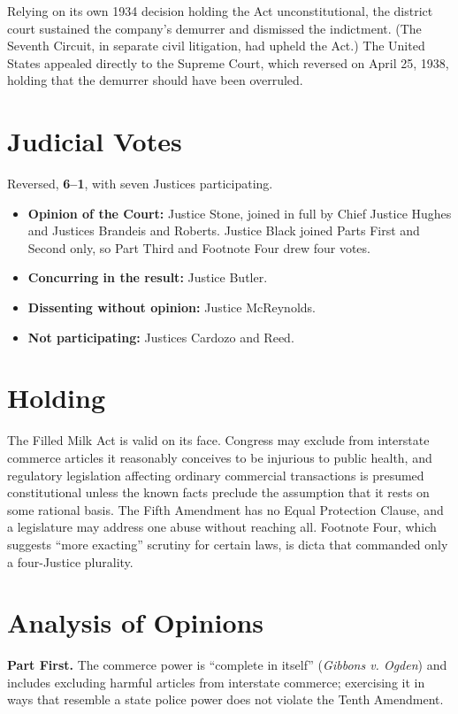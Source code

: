 \documentclass[12pt]{article}
\begin{document}
Relying on its own 1934 decision holding the Act unconstitutional, the district court sustained the company's demurrer and dismissed the indictment. (The Seventh Circuit, in separate civil litigation, had upheld the Act.) The United States appealed directly to the Supreme Court, which reversed on April 25, 1938, holding that the demurrer should have been overruled.

\section{Judicial Votes}

Reversed, \textbf{6--1}, with seven Justices participating.
\begin{itemize}
\item \textbf{Opinion of the Court:} Justice Stone, joined in full by Chief Justice Hughes and Justices Brandeis and Roberts. Justice Black joined Parts First and Second only, so Part Third and Footnote Four drew four votes.
\item \textbf{Concurring in the result:} Justice Butler.
\item \textbf{Dissenting without opinion:} Justice McReynolds.
\item \textbf{Not participating:} Justices Cardozo and Reed.
\end{itemize}

\section{Holding}

The Filled Milk Act is valid on its face. Congress may exclude from interstate commerce articles it reasonably conceives to be injurious to public health, and regulatory legislation affecting ordinary commercial transactions is presumed constitutional unless the known facts preclude the assumption that it rests on some rational basis. The Fifth Amendment has no Equal Protection Clause, and a legislature may address one abuse without reaching all. Footnote Four, which suggests ``more exacting'' scrutiny for certain laws, is dicta that commanded only a four-Justice plurality.

\section{Analysis of Opinions}

\textbf{Part First.} The commerce power is ``complete in itself'' (\textit{Gibbons v. Ogden}) and includes excluding harmful articles from interstate commerce; exercising it in ways that resemble a state police power does not violate the Tenth Amendment.
\end{document}
